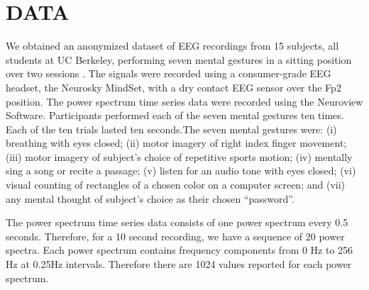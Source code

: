 \section{\uppercase{Data}}
\label{sec:data}


\noindent We obtained an anonymized dataset of EEG recordings from 15 subjects, all students at UC Berkeley, performing seven mental gestures in a sitting position over two sessions \cite{adams_i_2013}. The signals were recorded using a consumer-grade EEG headset, the Neurosky MindSet, with a dry contact EEG sensor over the Fp2 position. The power spectrum time series data were recorded using the Neuroview Software.
Participants performed each of the seven mental gestures ten times. Each of the ten trials lasted ten seconds.The seven mental gestures were: (i) breathing with eyes closed; (ii) motor imagery of right index finger movement; (iii) motor imagery of subject's choice of repetitive sports motion; (iv) mentally sing a song or recite a passage; (v) listen for an audio tone with eyes closed; (vi) visual counting of rectangles of a chosen color on a computer screen; and (vii) any mental thought of subject's choice as their chosen ``password''.


The power spectrum time series data consists of one power spectrum every 0.5 seconds. Therefore, for a 10 second recording, we have a sequence of 20 power spectra. Each power spectrum contains frequency components from 0 Hz to 256 Hz at 0.25Hz intervals. Therefore there are 1024 values reported for each power spectrum.


